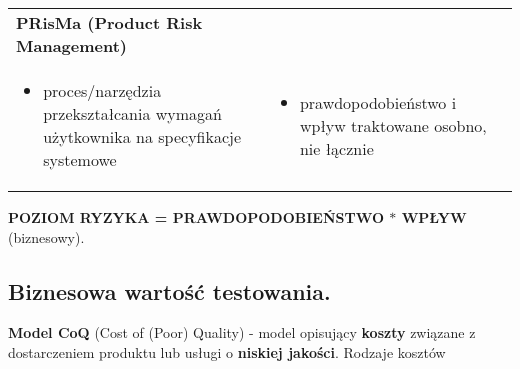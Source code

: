 \documentclass[../main.tex]{subfiles}
\begin{document}
\begin{table}[H]
\begin{center}
\begin{tabular}{| p{8cm} | p{8cm} |}
                \textbf{PRisMa (Product Risk Management)} \\
                \begin{itemize}
                    \item proces/narzędzia przekształcania wymagań użytkownika na specyfikacje systemowe
                \end{itemize}
                &
                \begin{itemize}
                    \item prawdopodobieństwo i wpływ traktowane osobno, nie łącznie
                \end{itemize}
                \\
                \hline
            \end{tabular}
        \end{center}
    \end{table}

    \textbf{POZIOM RYZYKA = PRAWDOPODOBIEŃSTWO $*$ WPŁYW}  (biznesowy).

    \subsection{Biznesowa wartość testowania.}

    \textbf{Model CoQ} (Cost of (Poor) Quality) - model opisujący \textbf{koszty} związane z dostarczeniem
    produktu lub usługi o \textbf{niskiej jakości}.
    Rodzaje kosztów
\end{document}
